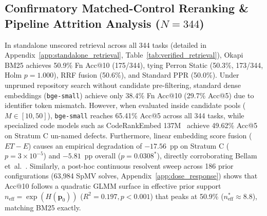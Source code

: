 \documentclass[10pt]{article}
\begin{document}
\subsection{Confirmatory Matched-Control Reranking \& Pipeline Attrition Analysis ($N=344$)}
\label{sec:rq1_rq2}
In standalone unscored retrieval across all 344 tasks (detailed in Appendix~\ref{app:standalone_retrieval}, Table~\ref{tab:verified_retrieval}), Okapi BM25 achieves 50.9\% Fn Acc@10 (175/344), tying Perron Static (50.3\%, 173/344, Holm $p=1.000$), RRF fusion (50.6\%), and Standard PPR (50.0\%). Under unpruned repository search without candidate pre-filtering, standard dense embeddings (\texttt{bge-small}) achieve only 38.4\% Fn Acc@10 (29.7\% Acc@5) due to identifier token mismatch. However, when evaluated inside candidate pools ($M \in [10, 50]$), \texttt{bge-small} reaches 65.41\% Acc@5 across all 344 tasks, while specialized code models such as CodeRankEmbed 137M~\cite{suresh2024coderankembed} achieve 49.62\% Acc@5 on Stratum C un-named defects. Furthermore, linear embedding score fusion ($ET-E$) causes an empirical degradation of $-17.56$~pp on Stratum C ($p = 3 \times 10^{-5}$) and $-5.81$~pp overall ($p=0.0308^*$), directly corroborating Bellam et~al.~\cite{bellam2025limits}. Similarly, a post-hoc continuous resolvent sweep across 186 prior configurations (63,984 SpMV solves, Appendix~\ref{app:dose_response}) shows that Acc@10 follows a quadratic GLMM surface in effective prior support $n_{\text{eff}} = \exp(H(\mathbf{p}_0))$ ($R^2=0.197, p<0.001$) that peaks at 50.9\% ($n_{\text{eff}}^* \approx 8.8$), matching BM25 exactly.
\end{document}
